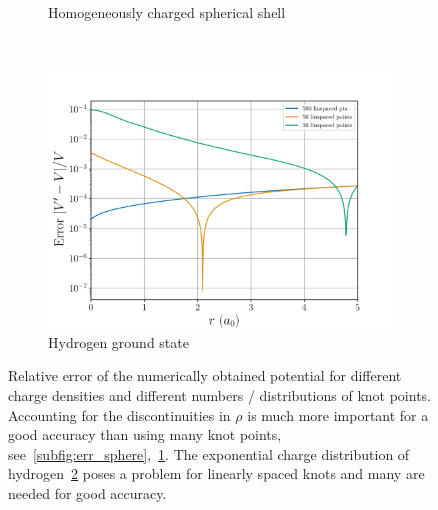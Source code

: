 \documentclass[a4paper,DIV=12,english]{scrartcl}
\begin{document}
\begin{figure}
\begin{subfigure}{0.49\textwidth}
        \caption{Homogeneously charged spherical shell}
        \label{subfig:err_shell}
    \end{subfigure}\\
    \begin{subfigure}{0.49\textwidth}
        \centering
        \includegraphics[width=\textwidth]{../plots/potential_error/error_hydrogen_test.pdf}
        \caption{Hydrogen ground state}
        \label{subfig:err_hydro}
    \end{subfigure}
    \caption{Relative error of the numerically obtained potential for different charge densities and different numbers / distributions of knot points. Accounting for the discontinuities in $\rho$ is much more important for a good accuracy than using many knot points, see~\ref{subfig:err_sphere},~\ref{subfig:err_shell}. The exponential charge distribution of hydrogen~\ref{subfig:err_hydro} poses a problem for linearly spaced knots and many are needed for good accuracy.}
    \label{fig:errors}
\end{figure}

\FloatBarrier
\end{document}
